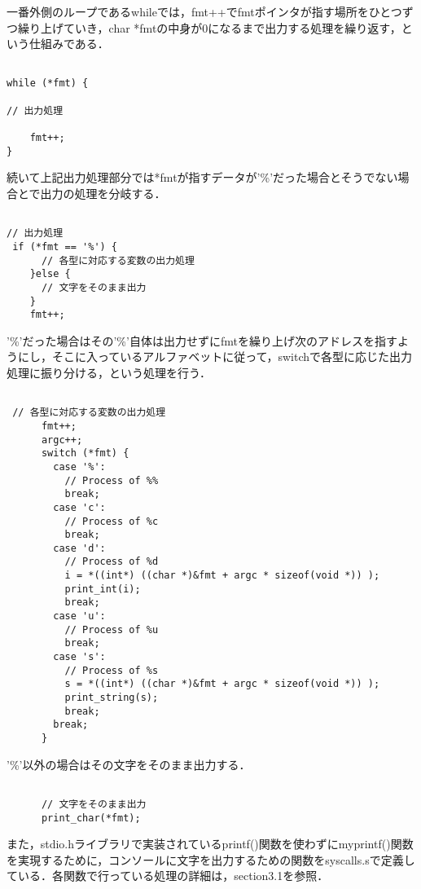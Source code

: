 \documentclass[a4j]{jarticle}
\begin{document}
一番外側のループであるwhileでは，fmt++でfmtポインタが指す場所をひとつずつ繰り上げていき，char *fmtの中身が0になるまで出力する処理を繰り返す，という仕組みである．

{\baselineskip 3mm
  \begin{verbatim}

while (*fmt) {

// 出力処理

    fmt++;
}

\end{verbatim}
}

続いて上記出力処理部分では*fmtが指すデータが'\%'だった場合とそうでない場合とで出力の処理を分岐する．

{\baselineskip 3mm
  \begin{verbatim}

// 出力処理
 if (*fmt == '%') {
      // 各型に対応する変数の出力処理
    }else {
      // 文字をそのまま出力
    }
    fmt++;

\end{verbatim}
}

'\%'だった場合はその'\%'自体は出力せずにfmtを繰り上げ次のアドレスを指すようにし，そこに入っているアルファベットに従って，switchで各型に応じた出力処理に振り分ける，という処理を行う．

{\baselineskip 3mm
  \begin{verbatim}

 // 各型に対応する変数の出力処理
      fmt++;
      argc++;
      switch (*fmt) {
        case '%':
          // Process of %%
          break;
        case 'c':
          // Process of %c
          break;
        case 'd':
          // Process of %d
          i = *((int*) ((char *)&fmt + argc * sizeof(void *)) );
          print_int(i);
          break;
        case 'u':
          // Process of %u
          break;
        case 's':
          // Process of %s
          s = *((int*) ((char *)&fmt + argc * sizeof(void *)) );
          print_string(s);
          break;
        break;
      }

\end{verbatim}
}

'\%'以外の場合はその文字をそのまま出力する．

{\baselineskip 3mm
  \begin{verbatim}

      // 文字をそのまま出力 
      print_char(*fmt);

\end{verbatim}
}


また，stdio.hライブラリで実装されているprintf()関数を使わずにmyprintf()関数を実現するために，コンソールに文字を出力するための関数をsyscalls.sで定義している．各関数で行っている処理の詳細は，section3.1を参照． 
\end{document}

